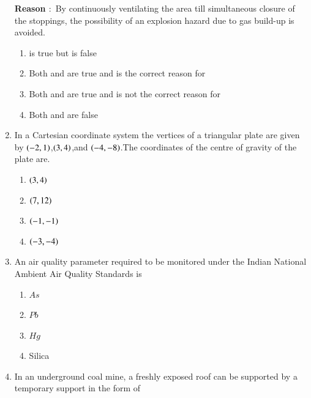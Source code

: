 \documentclass[journal,12pt,onecolumn]{IEEEtran}
\theoremstyle{remark}
\begin{document}
\begin{enumerate}
\vspace{0.5em}
\noindent
\textbf{Reason  $\colon$} By continuously ventilating the area till simultaneous closure of the stoppings, the possibility of an explosion hazard due to gas build-up is avoided.
\vspace{1em}

\hfill{}    
\begin{enumerate}
    \item {} is true but  is false
    \item Both  and  are true and  is the correct reason for 
    \item Both  and  are true and  is not the correct reason for 
    \item Both  and  are false

\end{enumerate}
\item In a Cartesian coordinate system the vertices of a triangular plate are given by $\left(-2, 1\right)$,$\left(3, 4\right)$,and $\left(-4, -8\right)$.The coordinates of the centre of gravity of the plate are.

\hfill{}
\begin{multicols}{4}
\begin{enumerate}
\item $\left(3,4\right)$
\item $\left(7,12\right)$ 
\item $\left(-1,-1\right)$
\item $\left(-3,-4\right)$
\end{enumerate}
\end{multicols}
\item An air quality parameter required to be monitored under the Indian National Ambient Air Quality Standards is

\hfill{} 
\begin{multicols}{4}
\begin{enumerate}
\item $As$
\item $Pb$
\item $Hg$
\item Silica
\end{enumerate}
\end{multicols}
\item In an underground coal mine, a freshly exposed roof can be supported by a temporary support in the form of


\end{enumerate}
\end{document}
